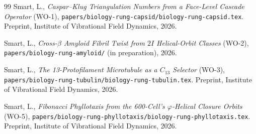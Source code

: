 \documentclass[12pt]{article}
\newcommand{\phig}{\varphi}
\begin{document}
\begin{thebibliography}{99}
Smart, L.,
\emph{Caspar--Klug Triangulation Numbers from a Face-Level
Cascade Operator} (WO-1),
\texttt{papers/biology-rung-capsid/biology-rung-capsid.tex}.
Preprint, Institute of Vibrational Field Dynamics, 2026.

Smart, L.,
\emph{Cross-$\beta$ Amyloid Fibril Twist from $2I$ Helical-Orbit
Classes} (WO-2),
\texttt{papers/biology-rung-amyloid/} (in preparation), 2026.

Smart, L.,
\emph{The 13-Protofilament Microtubule as a $C_{13}$ Selector}
(WO-3),
\texttt{papers/biology-rung-tubulin/biology-rung-tubulin.tex}.
Preprint, Institute of Vibrational Field Dynamics, 2026.

Smart, L.,
\emph{Fibonacci Phyllotaxis from the 600-Cell's $\phig$-Helical
Closure Orbits} (WO-5),
\texttt{papers/biology-rung-phyllotaxis/biology-rung-phyllotaxis.tex}.
Preprint, Institute of Vibrational Field Dynamics, 2026.

\end{thebibliography}
\end{document}

